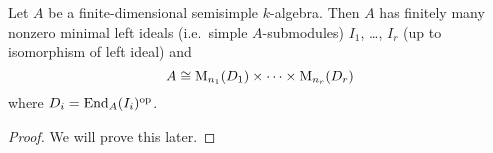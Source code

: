 \begin{cor}
 Let $A$ be a finite-dimensional semisimple $k$-algebra. Then $A$ has finitely many nonzero minimal left ideals (i.e.\ simple $A$-submodules) $I_1$, \dots, $I_r$ (up to isomorphism of left ideal) and
 \[
  A \cong \operatorname{M}_{n_1}(D_1) \times \dotsm \times \operatorname{M}_{n_r}(D_r)
 \]
 where $D_i = \operatorname{End}_A(I_i)^{\mathrm{op}}$.
\end{cor}
\begin{proof}
 We will prove this later.
\end{proof}






















































